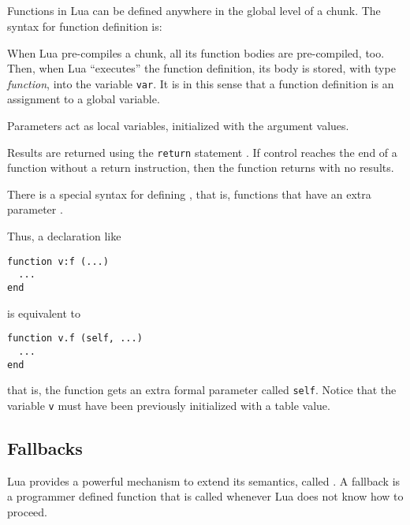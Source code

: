 \subsection{}

Functions in Lua can be defined anywhere in the global level of a chunk.
The syntax for function definition is:
\begin{Produc}
\end{Produc}

When Lua pre-compiles a chunk,
all its function bodies are pre-compiled, too.
Then, when Lua ``executes'' the function definition,
its body is stored, with type {\em function},
into the variable \verb'var'.
It is in this sense that
a function definition is an assignment to a global variable.

Parameters act as local variables,
initialized with the argument values.
\begin{Produc}
\end{Produc}

Results are returned using the \verb'return' statement .
If control reaches the end of a function without a return instruction,
then the function returns with no results.

There is a special syntax for defining ,
that is, functions that have an extra parameter .
\begin{Produc}
\end{Produc}%
Thus, a declaration like
\begin{verbatim}
function v:f (...)
  ...
end
\end{verbatim}
is equivalent to
\begin{verbatim}
function v.f (self, ...)
  ...
end
\end{verbatim}
that is, the function gets an extra formal parameter called \verb'self'.
Notice that
the variable \verb'v' must have been previously initialized with a table value.


\subsection{Fallbacks} \label{fallback}

Lua provides a powerful mechanism to extend its semantics,
called .
A fallback is a programmer defined function
that is called whenever Lua does not know how to proceed.

